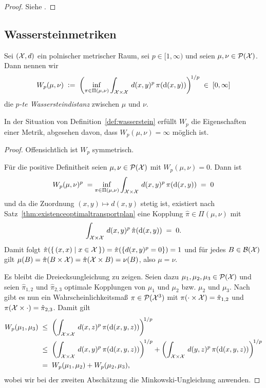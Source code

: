 \documentclass[../main/main.tex]{subfiles}
\begin{document}
	\begin{proof}
		Siehe \cite[Folgerung 5.21]{Villani.2009}.
	\end{proof}

	\subsection{Wassersteinmetriken}

	\begin{Definition}
		\label{def:wasserstein}
		Sei $(\mathcal{X}, d)$ ein polnischer metrischer Raum, sei $p \in [1, \infty)$ und seien $\mu, \nu \in \mathcal{P}(\mathcal{X})$. Dann nennen wir
		$$ W_p(\mu, \nu) \; \vcentcolon = \; \left(\inf_{\pi \in \Pi(\mu, \nu)} \int_{\mathcal{X} \times \mathcal{X}} \, d(x, y)^p \, \pi(\mathrm{d}(x, y))\right)^{\! 1/p} \; \in \; [0, \infty] $$
		die \emph{$p$-te Wassersteindistanz} zwischen $\mu$ und $\nu$.
	\end{Definition}

	\begin{Satz}
		\label{thm:wassersteinismetric}
		In der Situation von Definition~\ref{def:wasserstein} erfüllt $W_p$ die Eigenschaften einer Metrik, abgesehen davon, dass $W_p(\mu, \nu) = \infty$ möglich ist.
	\end{Satz}

	\begin{proof}
		Offensichtlich ist $W_p$ symmetrisch.
		
		Für die positive Definitheit seien $\mu, \nu \in \mathcal{P}(\mathcal{X})$ mit $W_p(\mu, \nu) = 0$. Dann ist
		\[ W_p(\mu, \nu)^p \; = \inf_{\pi \in \Pi(\mu, \nu)} \int_{\mathcal{X} \times \mathcal{X}} \, d(x, y)^p \, \pi(\mathrm{d}(x, y)) \; = \; 0 \]
		und da die Zuordnung $(x, y) \mapsto d(x, y)$ stetig ist, existiert nach Satz~\ref{thm:existenceoptimaltransportplan} eine Kopplung $\hat{\pi} \in \Pi(\mu, \nu)$ mit
		\[ \int_{\mathcal{X} \times \mathcal{X}} \, d(x, y)^p \, \hat{\pi}(\mathrm{d}(x, y)) \; = \; 0 \text{.} \]
		Damit folgt $\hat{\pi}(\left\{\, (x, x) \; \middle| \; x \in \mathcal{X} \,\right\}) = \hat{\pi}(\left\{d(x, y)^p = 0\right\}) = 1$ und für jedes $B \in \mathcal{B}(\mathcal{X})$ gilt
		$\mu(B) = \hat{\pi}(B \times \mathcal{X}) = \hat{\pi}(\mathcal{X} \times B) = \nu(B)$, also $\mu = \nu$.
		
		Es bleibt die Dreiecksungleichung zu zeigen. Seien dazu $\mu_1, \mu_2, \mu_3 \in \mathcal{P}(\mathcal{X})$ und seien $\hat{\pi}_{1, 2}$ und $\hat{\pi}_{2, 3}$ optimale Kopplungen von
		$\mu_1$ und $\mu_2$ bzw. $\mu_2$ und $\mu_3$. Nach \cite[S. 23-24]{Villani.2009} gibt es nun ein Wahrscheinlichkeitsmaß $\pi \in \mathcal{P}(\mathcal{X}^3)$ mit 
		$\pi(\cdot \times \mathcal{X}) = \hat{\pi}_{1, 2}$ und $\pi(\mathcal{X} \times \cdot) = \hat{\pi}_{2, 3}$. Damit gilt
		\begin{align*}
			W_p(\mu_1, \mu_3) \; &\leq \; \left(\int_{\mathcal{X} \times \mathcal{X}} \, d(x, z)^p \, \pi(\mathrm{d}(x, y, z))\right)^{\! 1/p} \\
			                     &\leq \; \left(\int_{\mathcal{X} \times \mathcal{X}} \, d(x, y)^p \, \pi(\mathrm{d}(x, y, z))\right)^{\! 1/p} + \left(\int_{\mathcal{X} \times \mathcal{X}} \, d(y, z)^p \, \pi(\mathrm{d}(x, y, z))\right)^{\! 1/p} \\
			                     &=    \; W_p(\mu_1, \mu_2) + W_p(\mu_2, \mu_3) \text{,}
		\end{align*}
		wobei wir bei der zweiten Abschätzung die Minkowski-Ungleichung anwenden.
	\end{proof}
\end{document}
